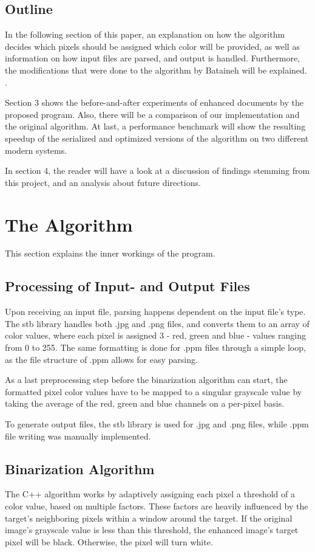 \documentclass[sigconf]{acmart}
\begin{document}
\subsection{Outline}
In the following section of this paper, an explanation on how the algorithm decides which pixels should be assigned which color will be provided, as well as information on how input files are parsed, and output is handled. Furthermore, the modifications that were done to the algorithm by Bataineh will be explained. \cite{Bataineh2011}.

Section 3 shows the before-and-after experiments of enhanced documents by the proposed program. Also, there will be a comparison of our implementation and the original algorithm. At last, a performance benchmark will show the resulting speedup of the serialized and optimized versions of the algorithm on two different modern systems.

In section 4, the reader will have a look at a discussion of findings stemming from this project, and an analysis about future directions.

\section{The Algorithm}
This section explains the inner workings of the program.

\subsection{Processing of Input- and Output Files}
\label{sub:sec:preprocessing}
Upon receiving an input file, parsing happens dependent on the input file's type. The stb library handles both .jpg and .png files, and converts them to an array of color values, where each pixel is assigned 3 - red, green and blue - values ranging from 0 to 255.
The same formatting is done for .ppm files through a simple loop, as the file structure of .ppm allows for easy parsing. 

As a last preprocessing step before the binarization algorithm can start, the formatted pixel color values have to be mapped to a singular grayscale value by taking the average of the red, green and blue channels on a per-pixel basis.

To generate output files, the stb library is used for .jpg and .png files, while .ppm file writing was manually implemented. 

\subsection{Binarization Algorithm}
The C++ algorithm works by adaptively assigning each pixel a threshold of a color value, based on multiple factors. These factors are heavily influenced by the target's neighboring pixels within a window around the target. If the original image's grayscale value is less than this threshold, the enhanced image's target pixel will be black. Otherwise, the pixel will turn white.
\end{document}
